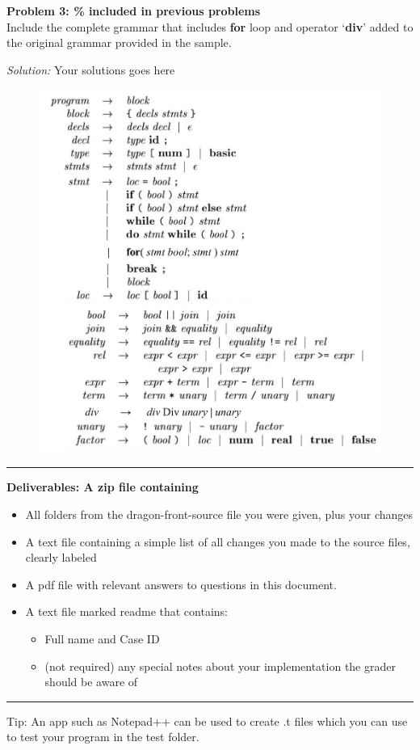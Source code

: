 \documentclass[a4paper, 11pt]{article}
\newenvironment{problem}[2][Problem]
    { \begin{mdframed}[backgroundcolor=gray!20] \textbf{#1 #2} \\}
    {  \end{mdframed}}
\newenvironment{solution}
    {\textit{Solution:}}
    {}
\begin{document}
\begin{problem}{3: \% included in previous problems}
Include the complete  grammar  that  includes  {\bf for}  loop  and  operator  ‘\textbf{div}’  added  to  the original grammar provided in the sample.

\end{problem}
\begin{solution}
    Your solutions goes here
    \begin{figure}
        \centering
        \includegraphics[scale=0.5]{grammar.pdf}
        \label{fig_3a}
    \end{figure}

\end{solution}
\noindent\rule{7in}{2.8pt}

\bf{Deliverables:} A zip file containing
\begin{itemize}
    \item All folders from the dragon-front-source file you were given, plus your changes
    \item A text file containing a simple list of all changes you made to the source files, clearly labeled
    \item A pdf file with relevant answers to questions in this document.
    \item A text file marked readme that contains:
          \begin{itemize}
              \item Full name and Case ID
              \item (not required) any special notes about your implementation the grader should be aware of
          \end{itemize}
\end{itemize}

\noindent\rule{7in}{2.8pt}
Tip: An app such as Notepad++ can be used to create .t files which you can use to test your program in the test folder.
\end{document}
